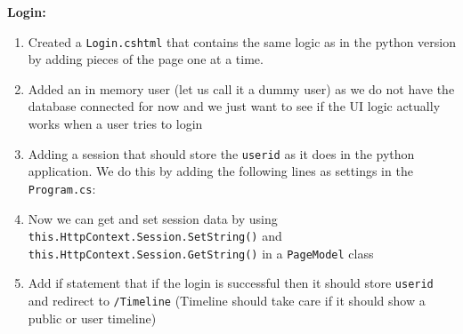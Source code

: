 \textbf{Login:}

\begin{enumerate}
    \item Created a \texttt{Login.cshtml} that contains the same logic as in the python version by adding pieces of the page one at a time.
    \item Added an in memory user (let us call it a dummy user) as we do not have the database connected for now and we just want to see if the UI logic actually works when a user tries to login
    \item Adding a session that should store the \texttt{userid} as it does in the python application. We do this by adding the following lines as settings in the \texttt{Program.cs}:




    \item Now we can get and set session data by using \texttt{this.HttpContext.Session.SetString()} and \texttt{this.HttpContext.Session.GetString()} in a \texttt{PageModel} class
    \item Add if statement that if the login is successful then it should store \texttt{userid} and redirect to \texttt{/Timeline} (Timeline should take care if it should show a public or user timeline)
\end{enumerate}

